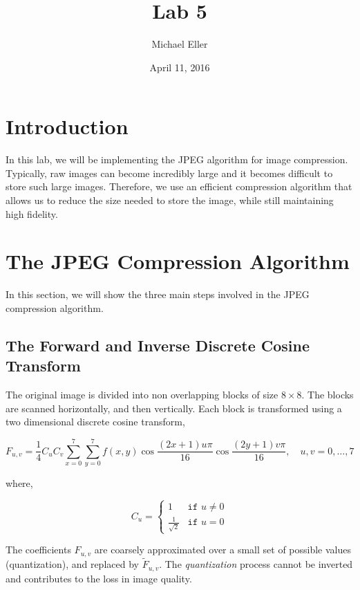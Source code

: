 \documentclass{article} %
\title{Lab 5}
\author{Michael Eller}
\date{April 11, 2016} %
\begin{document}
\maketitle

\tableofcontents
\clearpage
\section{Introduction}

In this lab, we will be implementing the JPEG algorithm for image compression. 
Typically, raw images can become incredibly large and it becomes difficult to store
such large images. Therefore, we use an efficient compression algorithm that
allows us to reduce the size needed to store the image, while still maintaining
high fidelity. 

\section{The JPEG Compression Algorithm}

In this section, we will show the three main steps involved in the JPEG
compression algorithm. 

\subsection{The Forward and Inverse Discrete Cosine Transform}
The original image is divided into non overlapping blocks of size $8 \times 8$.
The blocks are scanned horizontally, and then vertically. Each block is transformed
using a two dimensional discrete cosine transform,

\begin{equation}
\label{eq:dct2}
F_{u,v}=\frac{1}{4} C_u C_v \sum\limits_{x=0}^{7} \sum\limits_{y=0}^{7}
f(x,y) \cos \frac{(2x+1)u \pi}{16} \cos \frac{(2y+1)v \pi}{16}, \quad u,v=0,\dots,7
\end{equation}

where,

\begin{equation}
\label{eq:cu}
C_u=
\begin{cases}
1 & \texttt{if } u \neq 0\\
\frac{1}{\sqrt{2}} & \texttt{if } u=0
\end{cases}
\end{equation}

The coefficients $F_{u,v}$ are coarsely approximated over a small set of possible values (quantization),
and replaced by $\widetilde{F}_{u,v}$. The \emph{quantization} process cannot be inverted and contributes to the loss in image quality. \\
\end{document}
